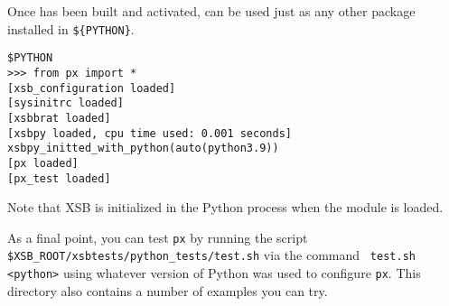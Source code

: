 Once \px has been built and activated, \px{} can be used just as any other package
installed in {\tt \$\{PYTHON\}}.

\begin{verbatim}
$PYTHON
>>> from px import *
[xsb_configuration loaded]
[sysinitrc loaded]
[xsbbrat loaded]
[xsbpy loaded, cpu time used: 0.001 seconds]
xsbpy_initted_with_python(auto(python3.9))
[px loaded]
[px_test loaded]
\end{verbatim}

\noindent
Note that XSB is initialized in the Python process when the \px{}
module is loaded.

As a final point, you can test {\tt px} by running the script {\tt
  \$XSB\_ROOT/xsbtests/python\_tests/test.sh} via the command {\tt
  test.sh <python>} using whatever version of Python was used to
configure {\tt px}.  This directory also contains a number of examples
you can try.






%



